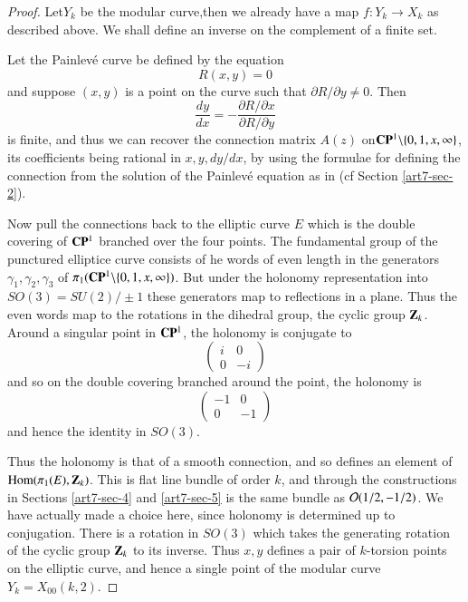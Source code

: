 \begin{proof}
Let\pageoriginale $Y_{k}$ be the modular curve,then we already have a map $f : Y_{k}\rightarrow X_{k}$ as described above. We shall define an inverse on the complement of a finite set.

Let the Painlev\'e curve be defined by the equation
$$
R(x,y)=0
$$
and suppose $(x,y)$ is a point on the curve such that $\partial R/\partial y \neq 0$. Then
$$
\dfrac{dy}{dx}= -\dfrac{\partial R /\partial x}{\partial R/ \partial y}
$$
is finite, and thus we can recover the connection matrix $A(z)$ on\break $\mathbf{C}\mathbf{P}^{1}\backslash \{0,1,x, \infty\}$, its coefficients being rational in $x,y, dy/dx$, by using the formulae for defining the connection from the solution of the Painlev\'e equation as in \cite{art7-key8} (cf Section \ref{art7-sec-2}).

Now pull the connections back to the elliptic curve $E$ which is the double covering of $\mathbf{C}\mathbf{P}^{1}$ branched over the four points. The fundamental group of the punctured elliptice curve consists of he words of even length in the generators $\gamma_{1}, \gamma_{2}, \gamma_{3}$ of $\pi_{1}(\mathbf{C}\mathbf{P}^{1}\backslash \{0,1,x,\infty\})$. But under the holonomy representation into $SO(3)=SU(2)/\pm 1$ these generators map to reflections in a plane. Thus the even words map to the rotations in the dihedral group, the cyclic group $\mathbf{Z}_{k}$. Around a singular point in $\mathbf{C}\mathbf{P}^{1}$, the holonomy is conjugate to
$$
\begin{pmatrix}
 i & 0\\
 0 & -i
\end{pmatrix}
$$
and so on the double covering branched around the point, the holonomy is
$$
\begin{pmatrix}
 -1 & 0\\
 0 & -1
\end{pmatrix}
$$
and hence the identity in $SO(3)$.

Thus the holonomy is that of a smooth connection, and so defines an element of $\operatorname{Hom}(\pi_{1}(E), \mathbf{Z}_{k})$. This is flat line bundle of order $k$, and through the constructions in Sections \ref{art7-sec-4} and \ref{art7-sec-5} is the same bundle as $\mathcal{O}(1/2, -1/2)$. We have actually made a choice here, since holonomy is determined up to
 conjugation. There is a rotation in $SO(3)$ which takes the generating rotation of the cyclic group $\mathbf{Z}_{k}$ to its inverse. Thus $x,y$ defines a pair of $k$-torsion points on the elliptic curve, and hence a single point of the modular curve $Y_{k} = X_{00}(k,2)$.
\end{proof}

